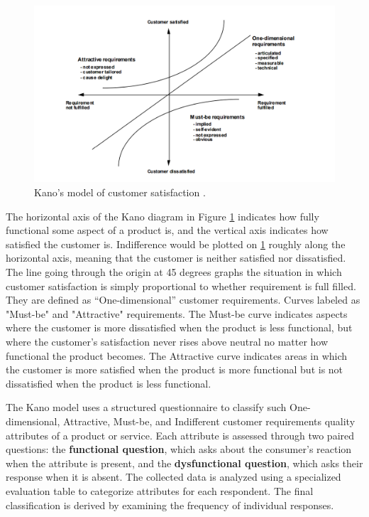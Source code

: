 \documentclass[../main.tex]{subfiles}
\begin{document}
\begin{figure}[h]
        \centering
        \includegraphics[scale=0.8]{img/2-background/kano/kano.png}
        \caption{Kano’s model of customer satisfaction \cite{kanomodel1996}.}
        \label{fig:kano}
\end{figure}

The horizontal axis of the Kano diagram in Figure \ref{fig:kano} indicates how fully functional some aspect of a product is, and the vertical axis 
indicates how satisfied the customer is. Indifference would be plotted on \ref{fig:kano} roughly along the horizontal axis, meaning that the customer is neither satisfied nor dissatisfied. The line going through the origin at 45 degrees graphs the situation in which customer satisfaction is simply proportional to whether requirement is full filled. They are defined as “One-dimensional” customer requirements. Curves labeled as "Must-be" and 
"Attractive" requirements. The Must-be curve indicates aspects where the customer is more dissatisfied when the product is less functional, but where 
the customer’s satisfaction never rises above neutral no matter how functional the product becomes. The Attractive curve indicates areas in which 
the customer is more satisfied when the product is more functional but is not dissatisfied when the product is less functional.  \cite{berger1993kano}

The Kano model uses a structured questionnaire to classify such One-dimensional, Attractive, Must-be, and Indifferent customer requirements quality attributes of a product or service. Each attribute is assessed through two paired questions: the \textbf{functional question}, which asks about the consumer’s reaction when the attribute is present, and the \textbf{dysfunctional question}, which asks their response when it is absent. The collected data is analyzed using a specialized evaluation table to categorize attributes for each respondent. The final classification is derived by examining the frequency of individual responses. \cite{kanomodel1996}
\end{document}
